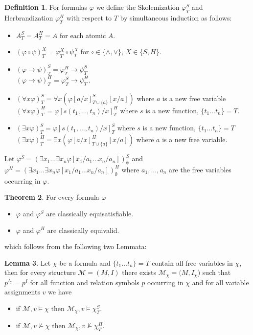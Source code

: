 \documentclass[a4paper,12pt]{report}
\theoremstyle{definition}
\newtheorem{theorem}{Theorem}[section]
\theoremstyle{definition}
\theoremstyle{definition}
\newtheorem{lemma}[theorem]{Lemma}
\theoremstyle{definition}
\theoremstyle{definition}
\newtheorem{definition}[theorem]{Definition}
\theoremstyle{definition}
\theoremstyle{definition}
\begin{document}
	\begin{definition}
		For formulas $\varphi$ we define the Skolemization $\varphi^S_T$ and Herbrandization $\varphi^H_T$ with respect to $T$ by simultaneous induction as follows:
		\begin{itemize}
			\item $A^S_T = A^H_T = A$ for each atomic $A$.
			\item $(\varphi\circ\psi)^X_T = \varphi^X_T\circ\psi^X_T$ for $\circ\in\{\wedge, \vee\}$, $X\in\{S, H\}$.
			\item $(\varphi\to\psi)^S_T = \varphi^H_T\to \psi^S_T$\\$(\varphi\to\psi)^H_T = \varphi^S_T\to\psi^H_T$.
			\item $(\forall x\varphi)^S_T = \forall x(\varphi[a/x]^S_{T\cup\{a\}}[x/a])$ where $a$ is a new free variable\\$(\forall x\varphi)^H_T = \varphi[s(t_1,\dots,t_n)/x]^H_T$ where $s$ is a new function, $\{t_1\dots t_n\} = T$.
			\item $(\exists x\varphi)^S_T = \varphi[s(t_1,\dots,t_n)/x]^S_T$ where $s$ is a new function, $\{t_1\dots t_n\} = T$\\$(\exists x\varphi)^H_T = \exists x(\varphi[a/x]^H_{T\cup\{a\}}[x/a])$ where $a$ is a new free variable.
		\end{itemize}
		Let $\varphi^S = (\exists x_1\dots\exists x_n \varphi[x_1/a_1\dots x_n/a_n])^S_\emptyset$ and $\varphi^H = (\exists x_1\dots\exists x_n \varphi[x_1/a_1\dots x_n/a_n])^H_\emptyset$ where $a_1,\dots,a_n$ are the free variables occurring in $\varphi$.
	\end{definition}

	\begin{theorem}For every formula $\varphi$
		\begin{itemize}
			\item $\varphi$ and $\varphi^S$ are classically equisatisfiable.
			\item $\varphi$ and $\varphi^H$ are classically equivalid.
		\end{itemize}
	\end{theorem}

	which follows from the following two Lemmata:
	
	\begin{lemma}
		Let $\chi$ be a formula and $\{t_1\dots t_n\} = T$ contain all free variables in $\chi$, then for every structure $\mathcal M = (M, I)$ there exists $\mathcal M_\chi = (M, I_\chi$) such that $p^{I_{\chi}} = p^I$ for all function and relation symbols $p$ occurring in $\chi$ and for all variable assignments $v$ we have
		\begin{itemize}
			\item if $\mathcal M, v\models\chi$ then $\mathcal M_\chi, v\models\chi^S_T$.
			\item if $\mathcal M, v\not\models\chi$ then $\mathcal M_\chi, v\not\models\chi^H_T$.
		\end{itemize}
	\end{lemma}
	
\end{document}
